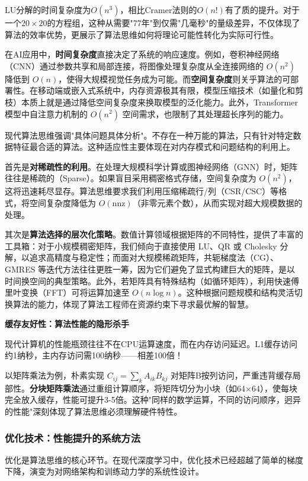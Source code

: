 LU分解的时间复杂度为$O(n^3)$，相比Cramer法则的$O(n!)$有了质的提升。对于一个$20 \times 20$的方程组，这种从需要"77年"到仅需"几毫秒"的量级差异，不仅体现了算法的效率优势，更展示了算法思维如何将理论可能性转化为实际可行性。

在AI应用中，\textbf{时间复杂度}直接决定了系统的响应速度。例如，卷积神经网络（CNN）通过参数共享和局部连接，将图像处理复杂度从全连接网络的 $O(n^2)$ 降低到 $O(n)$，使得大规模视觉任务成为可能。而\textbf{空间复杂度}则关乎算法的可部署性。在移动端或嵌入式系统中，内存资源极其有限，模型压缩技术（如量化和剪枝）本质上就是通过降低空间复杂度来换取模型的泛化能力。此外，Transformer 模型中自注意力机制的 $O(n^2)$ 空间需求，也限制了其处理超长序列的能力。

现代算法思维强调"具体问题具体分析"。不存在一种万能的算法，只有针对特定数据特征最合适的算法。这种适应性主要体现在对内存模式和问题结构的利用上。

首先是\textbf{对稀疏性的利用}。在处理大规模科学计算或图神经网络（GNN）时，矩阵往往是稀疏的（Sparse）。如果盲目采用稠密格式存储，空间复杂度为 $O(n^2)$，这将迅速耗尽显存。算法思维要求我们利用压缩稀疏行/列（CSR/CSC）等格式，将空间复杂度降低为 $O(\text{nnz})$（非零元素个数），从而实现对超大规模数据的处理。

其次是\textbf{算法选择的层次化策略}。数值计算领域根据矩阵的不同特性，提供了丰富的工具箱：对于小规模稠密矩阵，我们倾向于直接使用 LU、QR 或 Cholesky 分解，以追求高精度与稳定性；而面对大规模稀疏矩阵，共轭梯度法（CG）、GMRES 等迭代方法往往更胜一筹，因为它们避免了显式构建巨大的矩阵，是以时间换空间的典型策略。此外，若矩阵具有特殊结构（如循环矩阵），利用快速傅里叶变换（FFT）可将运算加速至 $O(n \log n)$。这种根据问题规模和结构灵活切换算法的能力，体现了算法工程师在资源约束下寻求最优解的智慧。

\textbf{缓存友好性：算法性能的隐形杀手}

现代计算机的性能瓶颈往往不在CPU运算速度，而在内存访问延迟。L1缓存访问约1纳秒，主内存访问需100纳秒——相差100倍！

以矩阵乘法为例，朴素实现 $C_{ij} = \sum_k A_{ik}B_{kj}$ 对矩阵B按列访问，严重违背缓存局部性。\textbf{分块矩阵乘法}通过重组计算顺序，将矩阵切分为小块（如64×64），使每块完全放入缓存，性能可提升3-5倍。这种"同样的数学运算，不同的访问顺序，迥异的性能"深刻体现了算法思维必须理解硬件特性。

\subsubsection{优化技术：性能提升的系统方法}
优化是算法思维的核心环节。在现代深度学习中，优化技术已经超越了简单的梯度下降，演变为对网络架构和训练动力学的系统性设计。

